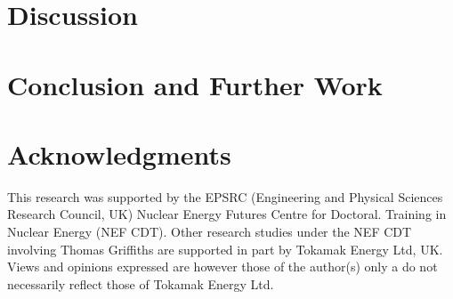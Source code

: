 \documentclass[lettersize,journal]{IEEEtran}
\begin{document}
\section{Discussion}\label{sec: Discussion}


\section{Conclusion and Further Work}\label{sec:conc}


\section{Acknowledgments}
This research was supported by the EPSRC (Engineering and Physical Sciences Research Council, UK) Nuclear Energy Futures Centre for Doctoral. Training in Nuclear Energy (NEF CDT).  Other research studies under the NEF CDT involving Thomas Griffiths are supported in part by Tokamak Energy Ltd, UK. Views and opinions expressed are however those of the author(s) only a do not necessarily reflect those of Tokamak Energy Ltd.

\scriptsize
\scriptsize
\end{document}
